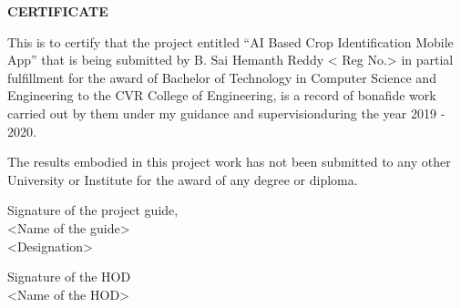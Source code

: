 \documentclass[../Report.tex]{subfiles}
\begin{document}
    \begin{center}
        \textbf{CERTIFICATE}
    \end{center}

    \setlength{\leftskip}{1.2cm}
    This is to certify that the project entitled “AI Based Crop Identification Mobile App” 
    that is being submitted by B. Sai Hemanth Reddy < Reg No.> in partial fulfillment for 
    the award of Bachelor of Technology in Computer Science and  Engineering to the 
    CVR College of Engineering, is a record of bonafide work carried out by them under my 
    guidance and supervisionduring the year 2019 - 2020.

    \vspace{\baselineskip}

    \setlength{\leftskip}{1.2cm}
    The results embodied in this project work has not been submitted to any other University 
    or Institute for the award of any degree or diploma.

    \vspace{\baselineskip}\vspace{\baselineskip}

    \setlength{\leftskip}{0pt}
    \begin{minipage}[t]{.5\textwidth}
        \raggedright
        Signature of the project guide, \\
        <Name of the guide> \\
        <Designation>
    \end{minipage}%
    \begin{minipage}[t]{.5\textwidth}
        \raggedleft
        Signature of the HOD \\
        <Name of the HOD>
    \end{minipage}

    \pagebreak
\end{document}
